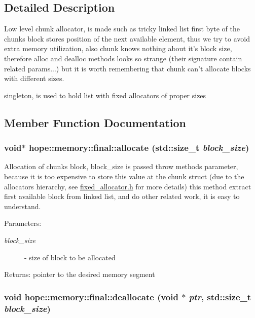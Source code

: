 \subsection{Detailed Description}
Low level chunk allocator, is made such as tricky linked list first byte of the chunks block stores position of the next available element, thus we try to avoid extra memory utilization, also chunk knows nothing about it's block size, therefore alloc and dealloc methods looks so strange (their signature contain related params...) but it is worth remembering that chunk can't allocate blocks with different sizes. 

singleton, is used to hold list with fixed allocators of proper sizes 

\subsection{Member Function Documentation}
\hypertarget{structhope_1_1memory_1_1final_6b0b52dcc62d04aa1a8c3bb6168a7ce4}{
\subsubsection[{allocate}]{\setlength{\rightskip}{0pt plus 5cm}void$\ast$ hope::memory::final::allocate (std::size\_\-t {\em block\_\-size})}}
\label{structhope_1_1memory_1_1final_6b0b52dcc62d04aa1a8c3bb6168a7ce4}


Allocation of chunks block, block\_\-size is passed throw methods parameter, because it is too expensive to store this value at the chunk struct (due to the allocators hierarchy, see \hyperlink{fixed__allocator_8h-source}{fixed\_\-allocator.h} for more details) this method extract first available block from linked list, and do other related work, it is easy to understand. 

\begin{Desc}
\item[Parameters:]
\begin{description}
\item[{\em block\_\-size}]- size of block to be allocated \end{description}
\end{Desc}
\begin{Desc}
\item[Returns:]pointer to the desired memory segment \end{Desc}
\hypertarget{structhope_1_1memory_1_1final_9c7e918080a8c1429ec8d241e7dfe0cf}{
\subsubsection[{deallocate}]{\setlength{\rightskip}{0pt plus 5cm}void hope::memory::final::deallocate (void $\ast$ {\em ptr}, \/  std::size\_\-t {\em block\_\-size})}}
\label{structhope_1_1memory_1_1final_9c7e918080a8c1429ec8d241e7dfe0cf}



